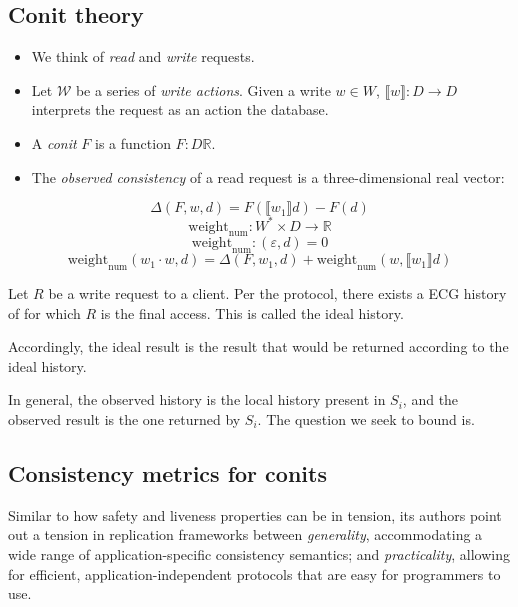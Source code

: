 \subsection{Conit theory}

\begin{itemize}

  \item We think of \emph{read} and \emph{write} requests.

  \item Let $\mathcal{W}$ be a series of \emph{write actions}. Given a write $w \in W$, $\llbracket w \rrbracket : D \to D$ interprets the request as an action the database.

  \item A \emph{conit} $F$ is a function $F : D \mathbb{R}$.

  \item The \emph{observed consistency} of a read request is a three-dimensional real vector:

\end{itemize}

\[ \Delta(F,w,d) = F(\llbracket w_1 \rrbracket d) - F (d)\]
\[ \textrm{weight}_{\textrm{num}} : W^\ast \times D \to \mathbb{R}\]
\[ \textrm{weight}_{\textrm{num}} : (\varepsilon, d) = 0 \]
\[ \textrm{weight}_{\textrm{num}} (w_1 \cdot w, d) = \Delta(F, w_1, d) + \textrm{weight}_{\textrm{num}} \left(w, \llbracket w_1 \rrbracket d\right) \]

Let $R$ be a write request to a client. Per the protocol, there exists
a ECG history of for which $R$ is the final access. This is called the
ideal history.

Accordingly, the ideal result is the result that would be returned
according to the ideal history.

In general, the observed history is the local history present in
$S_i$, and the observed result is the one returned by $S_i$. The
question we seek to bound is.


\subsection{Consistency metrics for conits}

Similar to how safety and liveness properties can be in tension, its
authors point out a tension in replication frameworks between
\emph{generality}, accommodating a wide range of application-specific
consistency semantics; and \emph{practicality}, allowing for
efficient, application-independent protocols that are easy for
programmers to use.

